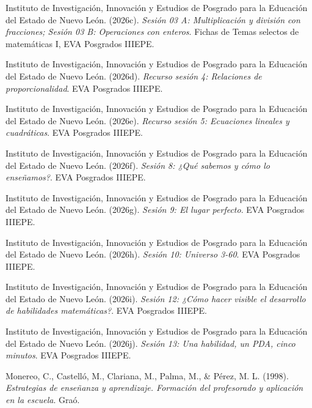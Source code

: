 \documentclass[spanish,letterpaper,oneside]{article}
\begin{document}
{\par\hangindent=1.27cm Instituto de Investigación, Innovación y Estudios de Posgrado para la Educación del Estado de Nuevo León. (2026c). \textit{Sesión 03 A: Multiplicación y división con fracciones; Sesión 03 B: Operaciones con enteros}. Fichas de Temas selectos de matemáticas I, EVA Posgrados IIIEPE.

\par\hangindent=1.27cm Instituto de Investigación, Innovación y Estudios de Posgrado para la Educación del Estado de Nuevo León. (2026d). \textit{Recurso sesión 4: Relaciones de proporcionalidad}. EVA Posgrados IIIEPE.

\par\hangindent=1.27cm Instituto de Investigación, Innovación y Estudios de Posgrado para la Educación del Estado de Nuevo León. (2026e). \textit{Recurso sesión 5: Ecuaciones lineales y cuadráticas}. EVA Posgrados IIIEPE.

\par\hangindent=1.27cm Instituto de Investigación, Innovación y Estudios de Posgrado para la Educación del Estado de Nuevo León. (2026f). \textit{Sesión 8: ¿Qué sabemos y cómo lo enseñamos?}. EVA Posgrados IIIEPE.

\par\hangindent=1.27cm Instituto de Investigación, Innovación y Estudios de Posgrado para la Educación del Estado de Nuevo León. (2026g). \textit{Sesión 9: El lugar perfecto}. EVA Posgrados IIIEPE.

\par\hangindent=1.27cm Instituto de Investigación, Innovación y Estudios de Posgrado para la Educación del Estado de Nuevo León. (2026h). \textit{Sesión 10: Universo 3-60}. EVA Posgrados IIIEPE.

\par\hangindent=1.27cm Instituto de Investigación, Innovación y Estudios de Posgrado para la Educación del Estado de Nuevo León. (2026i). \textit{Sesión 12: ¿Cómo hacer visible el desarrollo de habilidades matemáticas?}. EVA Posgrados IIIEPE.

\par\hangindent=1.27cm Instituto de Investigación, Innovación y Estudios de Posgrado para la Educación del Estado de Nuevo León. (2026j). \textit{Sesión 13: Una habilidad, un PDA, cinco minutos}. EVA Posgrados IIIEPE.

\par\hangindent=1.27cm Monereo, C., Castelló, M., Clariana, M., Palma, M., \& Pérez, M. L. (1998). \textit{Estrategias de enseñanza y aprendizaje. Formación del profesorado y aplicación en la escuela}. Graó.

}
\end{document}
